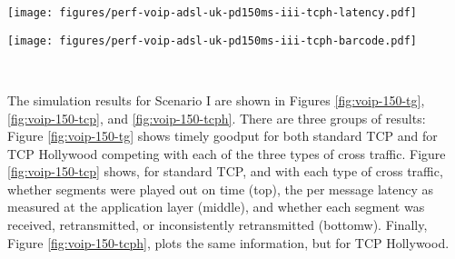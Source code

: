 \begin{figure*}[t!]
{{\begin{minipage}{61mm}
\end{minipage}
\begin{minipage}{61mm}
\texttt{[image: figures/perf-voip-adsl-uk-pd150ms-iii-tcph-latency.pdf]}\vspace{1mm}
\end{minipage}
\begin{minipage}{61mm}
\texttt{[image: figures/perf-voip-adsl-uk-pd150ms-iii-tcph-barcode.pdf]}\vspace{1mm}
\end{minipage}
\begin{minipage}{61mm}~\end{minipage}
}}
\caption{VoIP Scenario I: Play-out buffer, message latencies, and segment arrival plots for TCP Hollywood}
\label{fig:voip-150-tcph}
\end{figure*}

The simulation results for Scenario I are shown in Figures \ref{fig:voip-150-tg},
\ref{fig:voip-150-tcp}, and \ref{fig:voip-150-tcph}.
There are three groups of results:
Figure \ref{fig:voip-150-tg} shows timely goodput for both standard TCP and
for TCP Hollywood competing with each of the three types of cross traffic.
Figure \ref{fig:voip-150-tcp} shows, for standard TCP, and with each type
of cross traffic, whether segments were played out on time (top), the per
message latency as measured at the application layer (middle), and whether
each segment was received, retransmitted, or inconsistently retransmitted
(bottomw).
Finally, Figure \ref{fig:voip-150-tcph}, plots the same information, but
for TCP Hollywood.

